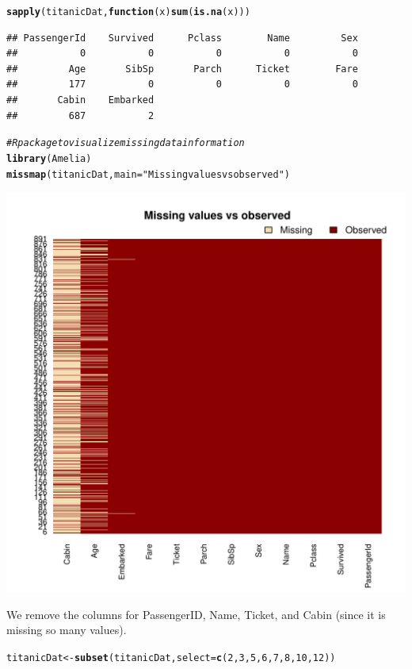 \documentclass{article}\usepackage[]{graphicx}\usepackage[]{color}
\makeatletter
\newcommand{\hlnum}[1]{\textcolor[rgb]{0.686,0.059,0.569}{#1}}%
\newcommand{\hlstr}[1]{\textcolor[rgb]{0.192,0.494,0.8}{#1}}%
\newcommand{\hlcom}[1]{\textcolor[rgb]{0.678,0.584,0.686}{\textit{#1}}}%
\newcommand{\hlstd}[1]{\textcolor[rgb]{0.345,0.345,0.345}{#1}}%
\newcommand{\hlkwa}[1]{\textcolor[rgb]{0.161,0.373,0.58}{\textbf{#1}}}%
\newcommand{\hlkwb}[1]{\textcolor[rgb]{0.69,0.353,0.396}{#1}}%
\newcommand{\hlkwc}[1]{\textcolor[rgb]{0.333,0.667,0.333}{#1}}%
\newcommand{\hlkwd}[1]{\textcolor[rgb]{0.737,0.353,0.396}{\textbf{#1}}}%
\newenvironment{kframe}{%
 \def\at@end@of@kframe{}%
 \ifinner\ifhmode%
  \def\at@end@of@kframe{\end{minipage}}%
  \begin{minipage}{\columnwidth}%
 \fi\fi%
 \def\FrameCommand##1{\hskip\@totalleftmargin \hskip-\fboxsep
 \colorbox{shadecolor}{##1}\hskip-\fboxsep
     \hskip-\linewidth \hskip-\@totalleftmargin \hskip\columnwidth}%
 \MakeFramed {\advance\hsize-\width
   \@totalleftmargin\z@ \linewidth\hsize
   \@setminipage}}%
 {\par\unskip\endMakeFramed%
 \at@end@of@kframe}
\newenvironment{knitrout}{}{} %
\makeatother
\begin{document}
\begin{knitrout}
\color{fgcolor}\begin{kframe}
\begin{alltt}
\hlkwd{sapply}\hlstd{(titanicDat,}\hlkwa{function}\hlstd{(}\hlkwc{x}\hlstd{)} \hlkwd{sum}\hlstd{(}\hlkwd{is.na}\hlstd{(x)))}
\end{alltt}
\begin{verbatim}
## PassengerId    Survived      Pclass        Name         Sex 
##           0           0           0           0           0 
##         Age       SibSp       Parch      Ticket        Fare 
##         177           0           0           0           0 
##       Cabin    Embarked 
##         687           2
\end{verbatim}
\begin{alltt}
\hlcom{# R package to visualize missing data information}
\hlkwd{library}\hlstd{(Amelia)}
\hlkwd{missmap}\hlstd{(titanicDat,} \hlkwc{main} \hlstd{=} \hlstr{"Missing values vs observed"}\hlstd{)}
\end{alltt}
\end{kframe}
\includegraphics[width=.7\linewidth]{figure/unnamed-chunk-10-1} 

\end{knitrout}

We remove the columns for PassengerID, Name, Ticket, and Cabin (since it is missing so many values).

\begin{knitrout}
\color{fgcolor}\begin{kframe}
\begin{alltt}
\hlstd{titanicDat} \hlkwb{<-} \hlkwd{subset}\hlstd{(titanicDat,}\hlkwc{select}\hlstd{=}\hlkwd{c}\hlstd{(}\hlnum{2}\hlstd{,}\hlnum{3}\hlstd{,}\hlnum{5}\hlstd{,}\hlnum{6}\hlstd{,}\hlnum{7}\hlstd{,}\hlnum{8}\hlstd{,}\hlnum{10}\hlstd{,}\hlnum{12}\hlstd{))}
\end{alltt}
\end{kframe}
\end{knitrout}
\end{document}
